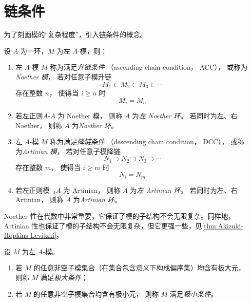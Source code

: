 \documentclass[12pt,a4paper]{ctexrep}   %
\begin{document}
\section{链条件}
为了刻画模的“复杂程度”，引入链条件的概念。
\begin{definition}
    设 $A$ 为一环，$M$ 为左 $A$-模，则：
    \begin{enumerate}
        \item
              左 $A$-模 $M$ 称为满足\emph{升链条件}
              （ascending chain condition， ACC），
              或称为\emph{Noether 模}，
              若对任意子模升链
              \[
                  M_1\subset M_2\subset M_3\subset\cdots
              \]
              存在整数 $n$，
              使得当 $i\ge n$ 时
              \[
                  M_i=M_n
              \]

        \item
              若左正则$A$-$A$ 为 Noether 模，
              则称 $A$ 为\emph{左 Noether 环}。
              若同时为左、右 Noether，
              则称 $A$ 为\emph{Noether 环}。

        \item
              左 $A$-模 $M$ 称为满足\emph{降链条件}
              （descending chain condition， DCC），
              或称为\emph{Artinian 模}，
              若对任意子模降链
              \[
                  N_1\supset N_2\supset N_3\supset\cdots
              \]
              存在整数 $m$，
              使得当 $i\ge m$ 时
              \[
                  N_i=N_m
              \]

        \item
              若左正则模 ${}_A A$ 为 Artinian，
              则称 $A$ 为\emph{左 Artinian 环}。
              若同时为左、右 Artinian，
              则称 $A$ 为\emph{Artinian 环}。
    \end{enumerate}
\end{definition}
Noether 性在代数中非常重要，它保证了模的子结构不会无限复杂。同样地，Artinian 性也保证了模的子结构不会无限复杂，但它更强一些，见\ref{thm:Akizuki-Hopkins-Levitzki}。

\begin{definition}
    设 $M$ 为左 $A$-模。
    \begin{enumerate}
        \item
              若 $M$ 的任意非空子模集合（在集合包含意义下构成偏序集）均含有极大元，
              则称 $M$ 满足\emph{极大条件}；
        \item
              若 $M$ 的任意非空子模集合均含有极小元，
              则称 $M$ 满足\emph{极小条件}。
    \end{enumerate}
\end{definition}
\end{document}
